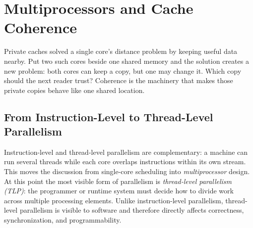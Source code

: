 \chapter[Multiprocessors and Coherence]{Multiprocessors and Cache Coherence}\label{ch:multiprocessors}

Private caches solved a single core's distance problem by keeping useful data nearby.
Put two such cores beside one shared memory and the solution creates a new problem: both cores can keep a copy, but one may change it.
Which copy should the next reader trust?
Coherence is the machinery that makes those private copies behave like one shared location.


\section{From Instruction-Level to Thread-Level Parallelism}\label{sec:mp-intro}
Instruction-level and thread-level parallelism are complementary: a machine can run several threads while each core overlaps instructions within its own stream.
This moves the discussion from single-core scheduling into \textit{multiprocessor} design.
At this point the most visible form of parallelism is \textit{thread-level parallelism (TLP)}: the programmer or runtime system must decide how to divide work across multiple processing elements.
Unlike instruction-level parallelism, thread-level parallelism is visible to software and therefore directly affects correctness, synchronization, and programmability.

